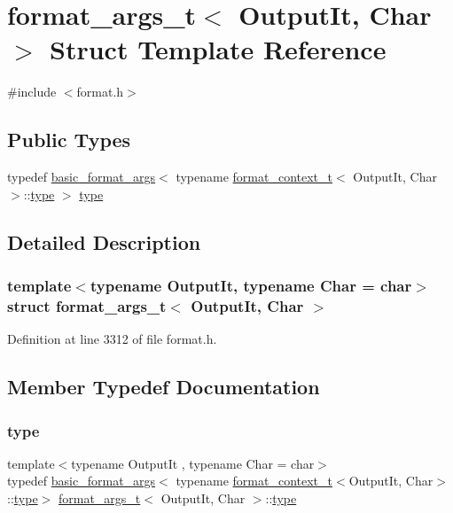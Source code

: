 \hypertarget{structformat__args__t}{}\section{format\+\_\+args\+\_\+t$<$ Output\+It, Char $>$ Struct Template Reference}
\label{structformat__args__t}


{\ttfamily \#include $<$format.\+h$>$}

\subsection*{Public Types}
\begin{DoxyCompactItemize}
\item 
typedef \hyperlink{classbasic__format__args}{basic\+\_\+format\+\_\+args}$<$ typename \hyperlink{structformat__context__t}{format\+\_\+context\+\_\+t}$<$ Output\+It, Char $>$\+::\hyperlink{structformat__args__t_aba50451f8c53f6f2ca5f428bcf734910}{type} $>$ \hyperlink{structformat__args__t_aba50451f8c53f6f2ca5f428bcf734910}{type}
\end{DoxyCompactItemize}


\subsection{Detailed Description}
\subsubsection*{template$<$typename Output\+It, typename Char = char$>$\newline
struct format\+\_\+args\+\_\+t$<$ Output\+It, Char $>$}



Definition at line 3312 of file format.\+h.



\subsection{Member Typedef Documentation}
\mbox{\label{structformat__args__t_aba50451f8c53f6f2ca5f428bcf734910}} 
\subsubsection{\texorpdfstring{type}{type}}
{\footnotesize\ttfamily template$<$typename Output\+It , typename Char  = char$>$ \\
typedef \hyperlink{classbasic__format__args}{basic\+\_\+format\+\_\+args}$<$ typename \hyperlink{structformat__context__t}{format\+\_\+context\+\_\+t}$<$Output\+It, Char$>$\+::\hyperlink{structformat__args__t_aba50451f8c53f6f2ca5f428bcf734910}{type}$>$ \hyperlink{structformat__args__t}{format\+\_\+args\+\_\+t}$<$ Output\+It, Char $>$\+::\hyperlink{structformat__args__t_aba50451f8c53f6f2ca5f428bcf734910}{type}}



